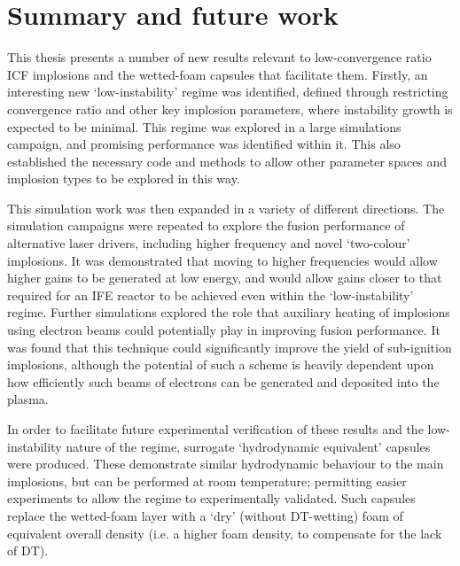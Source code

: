

\chapter{\label{ch:Conclusion}Summary and future work} 


This thesis presents a number of new results relevant to low-convergence ratio ICF implosions and the wetted-foam capsules that facilitate them. Firstly, an interesting new `low-instability' regime was identified, defined through restricting convergence ratio and other key implosion parameters, where instability growth is expected to be minimal. This regime was explored in a large simulations campaign, and promising performance was identified within it. This also established the necessary code and methods to allow other parameter spaces and implosion types to be explored in this way.

This simulation work was then expanded in a variety of different directions. The simulation campaigns were repeated to explore the fusion performance of alternative laser drivers, including higher frequency and novel `two-colour' implosions. It was demonstrated that moving to higher frequencies would allow higher gains to be generated at low energy, and would allow gains closer to that required for an IFE reactor to be achieved even within the `low-instability' regime. Further simulations explored the role that auxiliary heating of implosions using electron beams could potentially play in improving fusion performance. It was found that this technique could significantly improve the yield of sub-ignition implosions, although the potential of such a scheme is heavily dependent upon how efficiently such beams of electrons can be generated and deposited into the plasma.

In order to facilitate future experimental verification of these results and the low-instability nature of the regime, surrogate `hydrodynamic equivalent' capsules were produced. These demonstrate similar hydrodynamic behaviour to the main implosions, but can be performed at room temperature; permitting easier experiments to allow the regime to experimentally validated. Such capsules replace the wetted-foam layer with a `dry' (without DT-wetting) foam of equivalent overall density (i.e. a higher foam density, to compensate for the lack of DT).

